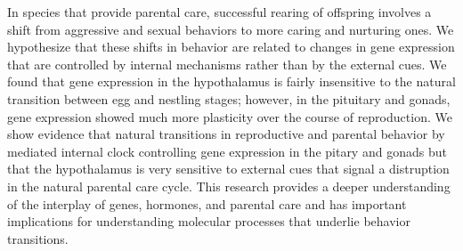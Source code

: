 
In species that provide parental care, successful rearing of offspring involves a shift from aggressive and sexual behaviors to more caring and nurturing ones.  We hypothesize that these shifts in behavior are related to changes in gene expression that are controlled by internal mechanisms rather than by the external cues.  We found that gene expression in the hypothalamus is fairly insensitive to the natural transition between egg and nestling stages; however, in the pituitary and gonads, gene expression showed much more plasticity over the course of reproduction. We show evidence that natural transitions in reproductive and parental behavior by mediated internal clock controlling gene expression in the pitary and gonads but that the hypothalamus is very sensitive to external cues that signal a distruption in the natural parental care cycle. This research provides a deeper understanding of the interplay of genes, hormones, and parental care and has important implications for understanding molecular processes that underlie behavior transitions. 